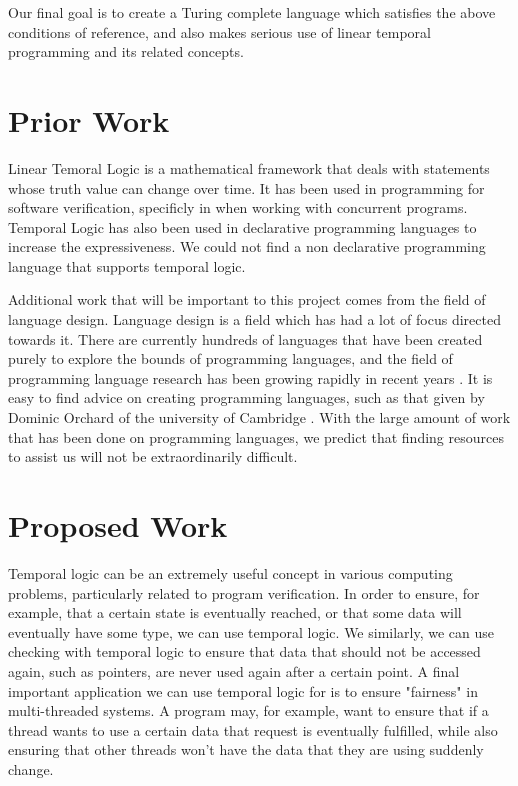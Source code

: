 \documentclass[numbers]{sigplanconf}
\begin{document}
Our final goal is to create a Turing complete language which satisfies
the above conditions of reference, and also makes serious use of linear temporal programming and its related concepts.

\section{Prior Work}
 

Linear Temoral Logic is a mathematical framework that deals with
statements whose truth value can change over time. It has been used in programming for
software verification, specificly in when working with concurrent
programs\cite{AutomaticVerification, SimpleVerification}. Temporal
Logic has also been used in declarative programming languages to
increase the expressiveness\cite{DeclarativeTemporal}. We could not find a non declarative programming language that
supports temporal logic. 

Additional work that will be important to this project comes from the field of language design.
Language design is a field which has had a lot of focus directed
towards it. There are currently hundreds of languages that
have been created purely to explore the bounds of programming languages, and the field of programming language research has been growing rapidly in recent years \cite{esolang}. It is easy to find advice on
creating programming languages, such as that given by Dominic Orchard
of the university of Cambridge \cite{4Rs}.  With the large amount of work
that has been done on programming languages, we predict that finding
resources to assist us will not be extraordinarily difficult.

\section{Proposed Work}
Temporal logic can be an extremely useful concept in various 
computing problems, particularly related to program verification. 
In order to ensure, for example, that a certain state is eventually
reached, or that some data will eventually have some type, we can use
temporal logic. We similarly, we can use checking with temporal logic to
 ensure that data that should not be accessed again, such as pointers,
 are never used again after a certain point. A final important 
 application we can use temporal logic for is to ensure "fairness" in
 multi-threaded systems. A program may, for example, want to ensure 
 that if a thread wants to use a certain data that request is
 eventually fulfilled, while also ensuring that other threads won't
 have the data that they are using suddenly change.
\end{document}
